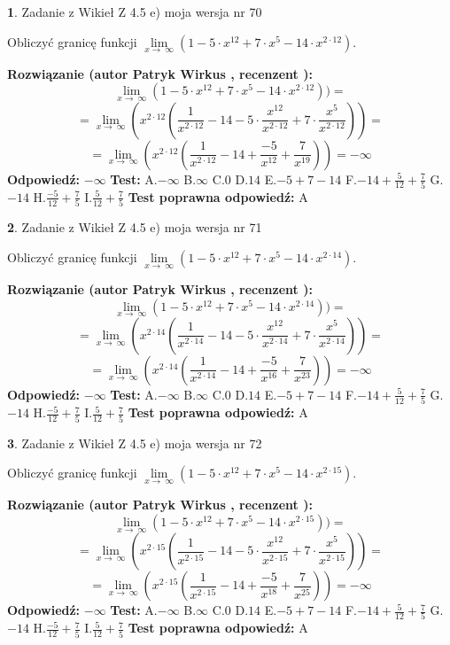\documentclass[12pt, a4paper]{article}
\theoremstyle{definition} %
\newtheorem{zad}{}
\newcommand{\zadStart}[1]{\begin{zad}#1\newline}
\newcommand{\zadStop}{\end{zad}}
\newcommand{\rozwStart}[2]{\noindent \textbf{Rozwiązanie (autor #1 , recenzent #2): }\newline}
\newcommand{\rozwStop}{\newline}
\newcommand{\odpStart}{\noindent \textbf{Odpowiedź:}\newline}
\newcommand{\odpStop}{\newline}
\newcommand{\testStart}{\noindent \textbf{Test:}\newline}
\newcommand{\testStop}{\newline}
\newcommand{\kluczStart}{\noindent \textbf{Test poprawna odpowiedź:}\newline}
\newcommand{\kluczStop}{\newline}
\begin{document}
\zadStart{Zadanie z Wikieł Z 4.5 e) moja wersja nr 70}



Obliczyć granicę funkcji  $\lim\limits_{x\to\ \infty}(1 - 5 \cdot x^{12}+7 \cdot x^{5}- 14 \cdot x^{2\cdot12})$.
\zadStop
\rozwStart{Patryk Wirkus}{}
$$\lim\limits_{x\to\ \infty}(1 - 5 \cdot x^{12}+7 \cdot x^{5}- 14 \cdot x^{2\cdot12}))=$$
$$=\lim\limits_{x\to\ \infty}(x^{2\cdot12}(\frac{1}{x^{2\cdot12}}-14 -5 \cdot \frac{x^{12}}{x^{2\cdot12}}+7 \cdot \frac{x^{5}}{x^{2\cdot12}}))=$$
$$=\lim\limits_{x\to\ \infty}(x^{2\cdot12}(\frac{1}{x^{2\cdot12}}-14 + \frac{-5}{x^{12}}+ \frac{7}{x^{19}}))=-\infty$$
\rozwStop
\odpStart
$-\infty$
\odpStop
\testStart
A.$-\infty$ B.$\infty$ C.$0$ D.$14$ E.$-5 + 7 - 14$
F.$-14+\frac{5}{12}+\frac{7}{5}$ G.$-14$
H.$\frac{-5}{12}+\frac{7}{5}$
I.$\frac{5}{12}+\frac{7}{5}$
\testStop
\kluczStart
A
\kluczStop



\zadStart{Zadanie z Wikieł Z 4.5 e) moja wersja nr 71}



Obliczyć granicę funkcji  $\lim\limits_{x\to\ \infty}(1 - 5 \cdot x^{12}+7 \cdot x^{5}- 14 \cdot x^{2\cdot14})$.
\zadStop
\rozwStart{Patryk Wirkus}{}
$$\lim\limits_{x\to\ \infty}(1 - 5 \cdot x^{12}+7 \cdot x^{5}- 14 \cdot x^{2\cdot14}))=$$
$$=\lim\limits_{x\to\ \infty}(x^{2\cdot14}(\frac{1}{x^{2\cdot14}}-14 -5 \cdot \frac{x^{12}}{x^{2\cdot14}}+7 \cdot \frac{x^{5}}{x^{2\cdot14}}))=$$
$$=\lim\limits_{x\to\ \infty}(x^{2\cdot14}(\frac{1}{x^{2\cdot14}}-14 + \frac{-5}{x^{16}}+ \frac{7}{x^{23}}))=-\infty$$
\rozwStop
\odpStart
$-\infty$
\odpStop
\testStart
A.$-\infty$ B.$\infty$ C.$0$ D.$14$ E.$-5 + 7 - 14$
F.$-14+\frac{5}{12}+\frac{7}{5}$ G.$-14$
H.$\frac{-5}{12}+\frac{7}{5}$
I.$\frac{5}{12}+\frac{7}{5}$
\testStop
\kluczStart
A
\kluczStop



\zadStart{Zadanie z Wikieł Z 4.5 e) moja wersja nr 72}



Obliczyć granicę funkcji  $\lim\limits_{x\to\ \infty}(1 - 5 \cdot x^{12}+7 \cdot x^{5}- 14 \cdot x^{2\cdot15})$.
\zadStop
\rozwStart{Patryk Wirkus}{}
$$\lim\limits_{x\to\ \infty}(1 - 5 \cdot x^{12}+7 \cdot x^{5}- 14 \cdot x^{2\cdot15}))=$$
$$=\lim\limits_{x\to\ \infty}(x^{2\cdot15}(\frac{1}{x^{2\cdot15}}-14 -5 \cdot \frac{x^{12}}{x^{2\cdot15}}+7 \cdot \frac{x^{5}}{x^{2\cdot15}}))=$$
$$=\lim\limits_{x\to\ \infty}(x^{2\cdot15}(\frac{1}{x^{2\cdot15}}-14 + \frac{-5}{x^{18}}+ \frac{7}{x^{25}}))=-\infty$$
\rozwStop
\odpStart
$-\infty$
\odpStop
\testStart
A.$-\infty$ B.$\infty$ C.$0$ D.$14$ E.$-5 + 7 - 14$
F.$-14+\frac{5}{12}+\frac{7}{5}$ G.$-14$
H.$\frac{-5}{12}+\frac{7}{5}$
I.$\frac{5}{12}+\frac{7}{5}$
\testStop
\kluczStart
A
\kluczStop
\end{document}
